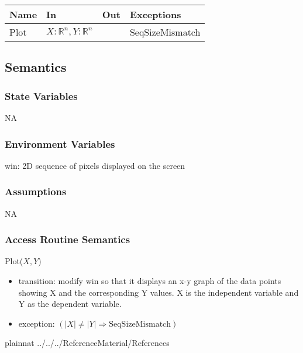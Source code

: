 \documentclass[12pt, titlepage]{article}
\begin{document}
\begin{center}
	\begin{tabular}{p{2cm} p{8cm} p{2cm} p{2cm}}
		\hline
		\textbf{Name} & \textbf{In} & \textbf{Out} & \textbf{Exceptions} \\
		\hline
		Plot & $X: \mathbb{R}^n, Y: \mathbb{R}^n$ & ~ & SeqSizeMismatch\\
		\hline
	\end{tabular}
\end{center}

\subsection{Semantics}

\subsubsection{State Variables}

NA

\subsubsection{Environment Variables}

win: 2D sequence of pixels displayed on the screen\\ 

\subsubsection{Assumptions}

NA

\subsubsection{Access Routine Semantics}

\noindent Plot($X, Y$)
\begin{itemize}
	\item transition: modify win so that it displays an x-y graph of the data 
	points showing X and the corresponding Y values.  X is the independent 
	variable and Y as the dependent variable.
	\item exception: $( |X| \neq |Y| \Longrightarrow \mbox{SeqSizeMismatch})$
\end{itemize}

\newpage




 {plainnat}
 {../../../ReferenceMaterial/References}

\newpage




\end{document}
